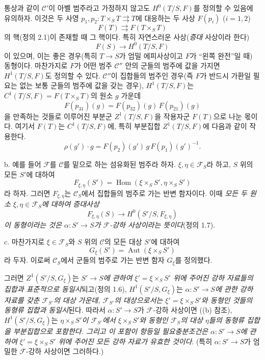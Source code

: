 통상과 같이 $\mathcal C'$이 아벨 범주라고 가정하지 않고도
$H^0(T/S,F)$를 정의할 수 있음에 유의하자. 이것은 두 사영
$p_1,p_2:T\times_ST\rightrightarrows T$에 대응하는 두 사상
$F(p_i)$ ($i=1,2$)
\[
  F(T)\rightrightarrows F(T\times_ST)
\]
의 핵(정의 2.1)이 존재할 때 그 핵이다. 특히 자연스러운 사상(\emph{증대}
사상이라 한다)
\[
  F(S)\longrightarrow H^0(T/S,F)
\]
이 있으며, 이는 좋은 경우(특히 $T\longrightarrow S$가 엄밀
에피사상이고 $F$가 ``왼쪽 완전''일 때) 동형이다. 마찬가지로 $F$가 어떤
범주 $\mathcal C''$ 안의 군들의 범주에 값을 가지면 $H^1(T/S,F)$도 정의할
수 있다. $\mathcal C''$이 집합들의 범주인 경우(즉 $F$가 반드시 가환일
필요는 없는 보통 군들의 범주에 값을 갖는 경우), $H^1(T/S,F)$는
$C^1(T/S,F)=F(T\times_ST)$의 원소 $g$ 가운데
\[
  F(p_{31})(g)=F(p_{32})(g)\,F(p_{21})(g)
\]
을 만족하는 것들로 이루어진 부분군 $Z^1(T/S,F)$을 작용자군 $F(T)$으로
나눈 몫이다. 여기서 $F(T)$는 $C^1(T/S,F)$에, 특히 부분집합
$Z^1(T/S,F)$에 다음과 같이 작용한다.
\[
  \rho(g')\cdot g=F(p_2)(g')\,g\,F(p_1)(g')^{-1}.
\]

\medskip\noindent
b. 예를 들어 $\mathcal F$를 $\mathcal C$를 밑으로 하는 섬유화된 범주라
하자. $\xi,\eta\in\mathcal F_S$라 하고, $S$ 위의 모든 $S'$에 대하여
\[
  F_{\xi,\eta}(S')=
  \operatorname{Hom}(\xi\times_SS',\eta\times_SS')
\]
라 하자. 그러면 $F_{\xi,\eta}$는 $\mathcal C_S$에서 집합들의 범주로
가는 반변 함자이다. 이때 \emph{모든 두 원소
$\xi,\eta\in\mathcal F_S$에 대하여 증대사상}
\[
  F_{\xi,\eta}(S)\longrightarrow H^0(S'/S,F_{\xi,\eta})
\]
\emph{이 동형이라는 것은 $\alpha:S'\longrightarrow S$가
$\mathcal F$-강하 사상이라는 뜻이다}(정의 1.7).

\medskip\noindent
c. 마찬가지로 $\xi\in\mathcal F_S$와 $S$ 위의 $\mathcal C$의 모든 대상
$S'$에 대하여
\[
  G_\xi(S')=\operatorname{Aut}(\xi\times_SS')
\]
라 두자. 이로써 $\mathcal C_S$에서 군들의 범주로 가는 반변 함자
$G_\xi$를 정의했다.

그러면 $Z^1(S'/S,G_\xi)$는 \emph{$S'\longrightarrow S$에 관하여
$\xi'=\xi\times_SS'$ 위에 주어진 강하 자료들의 집합과 표준적으로
동일시}되고(정의 1.6), $H^1(S'/S,G_\xi)$는 \emph{$\alpha:S'\longrightarrow S$에
관한 강하 자료를 갖춘 $\mathcal F_{S'}$의 대상 가운데,
$\mathcal F_{S'}$의 대상으로서는 $\xi'=\xi\times_SS'$와 동형인 것들의
동형류 집합과 동일시}된다. 따라서 $\alpha:S'\longrightarrow S$가
$\mathcal F$-강하 사상이면 ((b) 참조), $H^1(S'/S,G_\xi)$는
\emph{$\eta\times_SS'$이 $\mathcal F_{S'}$에서 $\xi\times_SS'$와 동형인
$\mathcal F_S$의 대상 $\eta$들의 동형류 집합을 부분집합으로 포함한다.
그리고 이 포함이 항등일 필요충분조건은 $\alpha:S'\longrightarrow S$에
관하여 $\xi'=\xi\times_SS'$ 위에 주어진 모든 강하 자료가 유효한 것이다}.
(특히 $\alpha:S'\longrightarrow S$가 엄밀한 $\mathcal F$-강하 사상이면
그러하다.)

